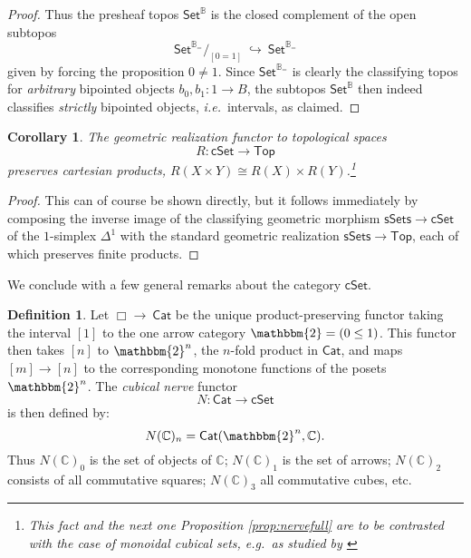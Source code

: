 \documentclass[11pt]{amsart}
\newcommand{\ie}{\emph{i.e.}}
\newcommand{\eg}{\emph{e.g.}}
\newcommand{\bbtwo}{\ensuremath{\mathbbm{2}}}
\newcommand{\B}{\ensuremath{\mathbb{B}}}
\newcommand{\bbC}{\ensuremath{\mathbb{C}}}
\newcommand{\Set}{\ensuremath{\mathsf{Set}}}
\newcommand{\Cat}{\ensuremath{\mathsf{Cat}}}
\newcommand{\cSet}{\ensuremath{\mathsf{cSet}}}
\newcommand{\hook}{\ensuremath{\hookrightarrow}}
\renewcommand{\to}{\ensuremath{\rightarrow}}
\newtheorem{corollary}[theorem]{Corollary}
\theoremstyle{remark}
\theoremstyle{definition}
\newtheorem{definition}[theorem]{Definition}
\begin{document}
\begin{proof}
Thus the presheaf topos $\Set^\B$ is the closed complement of the open subtopos $$\Set^{\B_=}/_{[0=1]}\ \hook\ \Set^{\B_=}$$ given by forcing the proposition $0 \neq 1$.  Since $\Set^{\B_=}$ is clearly the classifying topos for \emph{arbitrary} bipointed objects $b_0, b_1 : 1\to B$, the subtopos $\Set^\B$ then indeed classifies \emph{strictly} bipointed objects, \ie\ intervals, as claimed.
\end{proof}


\begin{corollary}
The geometric realization functor to topological spaces 
$$R: \cSet \to \mathsf{Top}$$
preserves cartesian products, $R(X\times Y) \cong R(X)\times R(Y)$.\footnote{This fact and the next one Proposition \ref{prop:nervefull} are to be contrasted with the case of monoidal cubical sets, \eg\ as studied by \cite{Jardine,Dougherty}}
\end{corollary}

\begin{proof}
This can of course be shown directly, but it follows immediately by composing the inverse image of the classifying geometric morphism $\mathsf{sSets} \to \cSet$ of the $1$-simplex $\Delta^1$ with the standard geometric realization $\mathsf{sSets} \to \mathsf{Top}$, each of which preserves finite products.
\end{proof}

We conclude with a few general remarks about the category $\cSet$.

\begin{definition}
Let $\Box \to\  \Cat$ be the unique product-preserving functor taking the interval $[1]$ to the one arrow  category $\bbtwo = (0\leq1)$.  This functor then takes $[n]$ to $\bbtwo^n$, the $n$-fold product in $\Cat$, and maps $[m] \to [n]$  to the corresponding monotone functions of the posets $\bbtwo^n$.  The  \emph{cubical nerve} functor $$N : \Cat \to \cSet$$ is then defined by:
\[
N(\bbC)_n = \Cat(\bbtwo^n, \bbC).
\]
Thus $N(\bbC)_0$  is the set of objects of \bbC; $N(\bbC)_1$ is the set of arrows; $N(\bbC)_2$ consists of all commutative squares; $N(\bbC)_3$ all commutative cubes, etc. 
\end{definition}
\end{document}
